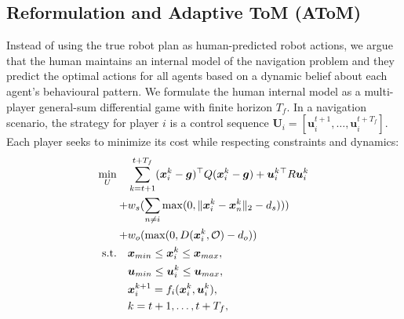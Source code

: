 
\subsection{Reformulation and Adaptive ToM (AToM)}
Instead of using the true robot plan as human-predicted robot actions, we argue that the human maintains an internal model of the navigation problem and they predict the optimal actions for all agents based on a dynamic belief about each agent's behavioural pattern. 
We formulate the human internal model as a multi-player general-sum differential game with finite horizon $T_{f}$. 
In a navigation scenario, the strategy for player $i$ is a control sequence $\boldsymbol{U}_{i} = [\boldsymbol{u}_{i}^{t+1}, \dots, \boldsymbol{u}_{i}^{t+T_{f}}]$. 
Each player seeks to minimize its cost while respecting constraints and dynamics:
\begin{equation}
\label{eq:game_cost}
\begin{aligned}
    \min_{U} \quad &\sum_{k=t+1}^{t+T_{f}} 
    (\boldsymbol{x}_{i}^{k} - \boldsymbol{g})^\top Q (\boldsymbol{x}_{i}^{k} - \boldsymbol{g}) 
    + \boldsymbol{u}_{i}^{k}{}^\top R \boldsymbol{u}_{i}^{k} \\
    +  &w_{s}(\sum_{n \neq i} \max (0, \|\boldsymbol{x}^{k}_{i} - \boldsymbol{x}^{k}_{n}\|_{2} - d_{s}))) \\
    + &w_{o}(\max (0, D(\boldsymbol{x}^{k}_{i}, \mathcal{O}) - d_{o}))\\
    \text{s.t.} \quad &\boldsymbol{x}_{min} \leq \boldsymbol{x}_{i}^{k} \leq \boldsymbol{x}_{max}, \\
                &\boldsymbol{u}_{min} \leq \boldsymbol{u}_{i}^{k} \leq \boldsymbol{u}_{max}, \\
                &\boldsymbol{x}_{i}^{k+1} = f_{i}(\boldsymbol{x}_{i}^{k}, \boldsymbol{u}_{i}^{k}), \\
                &k = t+1, \dots, t+T_{f}, \\
\end{aligned}
\end{equation}

